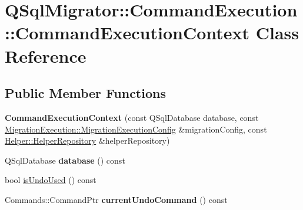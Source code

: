 \hypertarget{class_q_sql_migrator_1_1_command_execution_1_1_command_execution_context}{}\section{Q\+Sql\+Migrator\+:\+:Command\+Execution\+:\+:Command\+Execution\+Context Class Reference}
\label{class_q_sql_migrator_1_1_command_execution_1_1_command_execution_context}
\subsection*{Public Member Functions}
\begin{DoxyCompactItemize}
\item 
\mbox{\label{class_q_sql_migrator_1_1_command_execution_1_1_command_execution_context_a9833f37d1f355e9acf705c17c7a24a8a}} 
{\bfseries Command\+Execution\+Context} (const Q\+Sql\+Database database, const \hyperlink{struct_q_sql_migrator_1_1_migration_execution_1_1_migration_execution_config}{Migration\+Execution\+::\+Migration\+Execution\+Config} \&migration\+Config, const \hyperlink{class_q_sql_migrator_1_1_helper_1_1_helper_repository}{Helper\+::\+Helper\+Repository} \&helper\+Repository)
\item 
\mbox{\label{class_q_sql_migrator_1_1_command_execution_1_1_command_execution_context_ada9b80a7a767c3bb756a7a7c18c4e88d}} 
Q\+Sql\+Database {\bfseries database} () const
\item 
bool \hyperlink{class_q_sql_migrator_1_1_command_execution_1_1_command_execution_context_a48821a3965e12db6d06cfefcb103df2e}{is\+Undo\+Used} () const
\item 
\mbox{\label{class_q_sql_migrator_1_1_command_execution_1_1_command_execution_context_af52d5b954891e5b255de55986d8ced0a}} 
Commands\+::\+Command\+Ptr {\bfseries current\+Undo\+Command} () const
\item 
\mbox{\label{class_q_sql_migrator_1_1_command_execution_1_1_command_execution_context_a3d53a72137b6684d3210e4c4983b2b45}} 

\end{DoxyCompactItemize}
